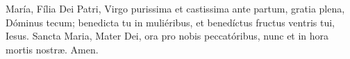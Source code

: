 María, Fília Dei Patri, Virgo purissima et castissima ante partum, gratia plena, Dóminus tecum; benedicta tu in muliéribus, 
et benedíctus fructus ventris tui, Iesus. Sancta Maria, Mater Dei, ora pro nobis peccatóribus, nunc et in hora mortis nostr{\ae}. Amen.